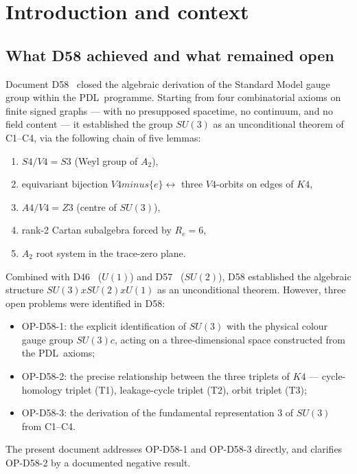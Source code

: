 \documentclass[11pt,a4paper]{article}
\def\Sfour{S4}%
\def\Vfour{V4}%
\def\Afour{A4}%
\def\Sthree{S3}%
\def\Zthree{Z3}%
\def\SUthree{SU(3)}%
\def\SUthreec{SU(3)c}%
\def\SUtwo{SU(2)}%
\def\Uone{U(1)}%
\def\Kfour{K4}%
\def\Re{Re}%
\def\PDL{PDL}%
\def\cong{=}%
\def\times{x}%
\def\setminus{ minus }%
\def\mathbb#1{#1}%
\def\mathrm#1{#1}%
\def\mathbf#1{#1}%
\def\textsc#1{#1}%
\theoremstyle{plain}
\theoremstyle{definition}
\theoremstyle{remark}
\newcommand{\PDL}{\textsc{PDL}}
\newcommand{\Kfour}{K_4}
\newcommand{\Sfour}{S_4}
\newcommand{\Afour}{A_4}
\newcommand{\Vfour}{V_4}
\newcommand{\Sthree}{S_3}
\newcommand{\Zthree}{\mathbb{Z}_3}
\newcommand{\SUthree}{\mathrm{SU}(3)}
\newcommand{\SUthreec}{\mathrm{SU}(3)_c}
\newcommand{\SUtwo}{\mathrm{SU}(2)}
\newcommand{\Uone}{\mathrm{U}(1)}
\renewcommand{\Re}{R_e}
\begin{document}
\tableofcontents
\newpage

\section{Introduction and context}
\label{sec:intro}

\subsection{What D58 achieved and what remained open}

Document D58~\cite{PDL_D58} closed the algebraic derivation of the Standard Model gauge group within the \PDL\ programme. Starting from four combinatorial axioms on finite signed graphs --- with no presupposed spacetime, no continuum, and no field content --- it established the group $\SUthree$ as an unconditional theorem of C1--C4, via the following chain of five lemmas:
\begin{enumerate}[leftmargin=2em]
\item $\Sfour/\Vfour \cong \Sthree$ (Weyl group of $A_2$),
\item equivariant bijection $\Vfour \setminus \{e\} \leftrightarrow$ three $\Vfour$-orbits on edges of $\Kfour$,
\item $\Afour/\Vfour \cong \Zthree$ (centre of $\SUthree$),
\item rank-2 Cartan subalgebra forced by $\Re = 6$,
\item $A_2$ root system in the trace-zero plane.
\end{enumerate}
Combined with D46~\cite{PDL_D46} ($\Uone$) and D57~\cite{PDL_D57} ($\SUtwo$), D58 established the algebraic structure $\SUthree \times \SUtwo \times \Uone$ as an unconditional theorem. However, three open problems were identified in D58:
\begin{itemize}[leftmargin=2em]
\item OP-D58-1: the explicit identification of $\SUthree$ with the physical colour gauge group $\SUthreec$, acting on a three-dimensional space constructed from the \PDL\ axioms;
\item OP-D58-2: the precise relationship between the three triplets of $\Kfour$ --- cycle-homology triplet (T1), leakage-cycle triplet (T2), orbit triplet (T3);
\item OP-D58-3: the derivation of the fundamental representation $\mathbf{3}$ of $\SUthree$ from C1--C4.
\end{itemize}
The present document addresses OP-D58-1 and OP-D58-3 directly, and clarifies OP-D58-2 by a documented negative result.
\end{document}
